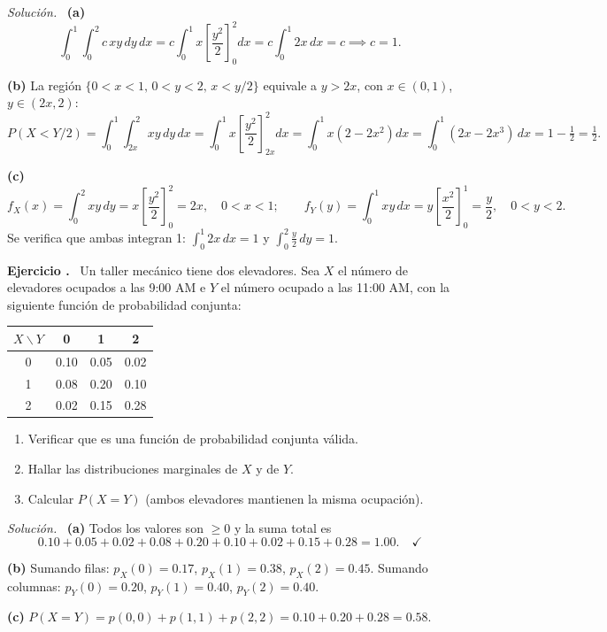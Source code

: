 \documentclass[11pt,a4paper]{article}
\newcounter{ejnum}
\newenvironment{ejercicio}{\refstepcounter{ejnum}\par\medskip\noindent\textbf{Ejercicio \theejnum.}~}{\par}
\newenvironment{solucion}{\par\noindent\textit{Solución.}~}{\par\vspace{1em}}
\begin{document}
\begin{solucion}
\textbf{(a)}
\[
\int_0^1\int_0^2 c\,xy\,dy\,dx = c\int_0^1 x\left[\frac{y^2}{2}\right]_0^2 dx = c\int_0^1 2x\,dx = c \implies c=1.
\]

\textbf{(b)} La región $\{0<x<1,\,0<y<2,\, x<y/2\}$ equivale a $y>2x$, con $x\in(0,1)$, $y\in(2x,2)$:
\[
P(X<Y/2) = \int_0^1 \int_{2x}^2 xy\,dy\,dx = \int_0^1 x\left[\frac{y^2}{2}\right]_{2x}^{2} dx = \int_0^1 x\left(2 - 2x^2\right) dx = \int_0^1 (2x-2x^3)\,dx = 1-\tfrac12 = \tfrac12.
\]

\textbf{(c)}
\[
f_X(x) = \int_0^2 xy\,dy = x\left[\frac{y^2}{2}\right]_0^2 = 2x, \quad 0<x<1; \qquad
f_Y(y) = \int_0^1 xy\,dx = y\left[\frac{x^2}{2}\right]_0^1 = \frac{y}{2}, \quad 0<y<2.
\]
Se verifica que ambas integran 1: $\int_0^1 2x\,dx=1$ y $\int_0^2 \tfrac{y}{2}\,dy=1$.
\end{solucion}

\begin{ejercicio}
Un taller mecánico tiene dos elevadores. Sea $X$ el número de elevadores ocupados a las 9:00 AM e $Y$ el número ocupado a las 11:00 AM, con la siguiente función de probabilidad conjunta:

\begin{center}
\begin{tabular}{c|ccc}
\toprule
$X\backslash Y$ & 0 & 1 & 2 \\
\midrule
0 & 0.10 & 0.05 & 0.02 \\
1 & 0.08 & 0.20 & 0.10 \\
2 & 0.02 & 0.15 & 0.28 \\
\bottomrule
\end{tabular}
\end{center}

\begin{enumerate}[label=(\alph*)]
\item Verificar que es una función de probabilidad conjunta válida.
\item Hallar las distribuciones marginales de $X$ y de $Y$.
\item Calcular $P(X=Y)$ (ambos elevadores mantienen la misma ocupación).
\end{enumerate}
\end{ejercicio}

\begin{solucion}
\textbf{(a)} Todos los valores son $\ge 0$ y la suma total es
\[
0.10+0.05+0.02+0.08+0.20+0.10+0.02+0.15+0.28 = 1.00. \quad\checkmark
\]

\textbf{(b)} Sumando filas: $p_X(0)=0.17$, $p_X(1)=0.38$, $p_X(2)=0.45$. Sumando columnas: $p_Y(0)=0.20$, $p_Y(1)=0.40$, $p_Y(2)=0.40$.

\textbf{(c)} $P(X=Y) = p(0,0)+p(1,1)+p(2,2) = 0.10+0.20+0.28 = 0.58$.
\end{solucion}
\end{document}
